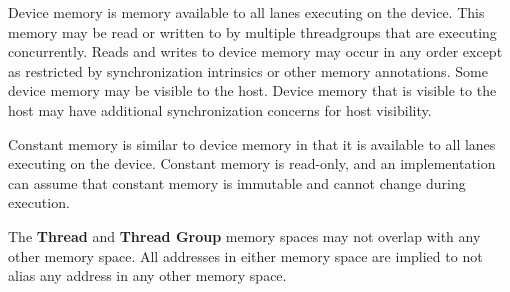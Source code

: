 \p Device memory is memory available to all \gls{lane}s executing on the device.
This memory may be read or written to by multiple \gls{threadgroup}s that are
executing concurrently. Reads and writes to device memory may occur in any order
except as restricted by synchronization intrinsics or other memory annotations.
Some device memory may be visible to the host. Device memory that is visible to
the host may have additional synchronization concerns for host visibility.


\p Constant memory is similar to device memory in that it is available to all
\gls{lane}s executing on the device. Constant memory is read-only, and an
implementation can assume that constant memory is immutable and cannot change
during execution.


\p The \textbf{Thread} and \textbf{Thread Group} memory spaces may not overlap
with any other memory space. All addresses in either memory space are implied to
not alias any address in any other memory space.
